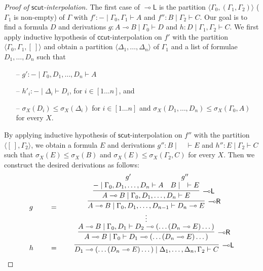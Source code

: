\documentclass[sn-mathphys-num]{sn-jnl}%
\newcommand{\GG}{\Gamma}
\newcommand{\GD}{\Delta}
\newcommand{\vd}{\vdash}
\newcommand{\lolli}{\multimap}
\newcommand{\lleft}{{\lolli}\mathsf{L}}
\newcommand{\lright}{{\lolli}\mathsf{R}}
\newcommand{\mf}[1]{\mathsf{#1}}
\newcommand{\gs}[1]{\sigma_{X} (#1)}
\theoremstyle{thmstyleone}%
\theoremstyle{thmstyletwo}%
\theoremstyle{thmstylethree}%
\begin{document}
\begin{proof}[Proof of $\mf{scut}$-interpolation]
The first case of $\lleft$ is the partition $\langle \GG_0, (\GG_1, \GG_2) \rangle$ ($\GG_1$ is non-empty) of $\GG$ with $f' : {-} \mid \GG_0, \GG_1 \vd A$ and $f'': B \mid \GG_2 \vd C$.
Our goal is to find a formula $D$ and derivations $g : A\lolli B \mid \GG_0 \vd D$ and $h: D \mid \GG_1, \GG_2 \vd C$.
We first apply inductive hypothesis of $\mf{ccut}$-interpolation on $f'$ with the partition $\langle \GG_0 , \GG_1 , [\ ]\rangle$ and obtain a partition $\langle \GD_1, \dots , \GD_n \rangle$ of $\GG_1$ and a list of formulae $D_1 , \dots , D_n$ such that
\begin{itemize}
  \item[--] $g': {-} \mid \GG_0 , D_1, \dots, D_n \vd A$
  \item[--] $h'_i : {-} \mid \GD_i \vd D_i$, for $i \in [1\dots n]$, and 
  \item[--] $\gs{D_i} \leq \gs{\GD_i}$ for $i \in [1 \dots n]$ and $\gs{D_1 , \dots , D_n} \leq \gs{\GG_0 , A}$ for every $X$.
\end{itemize}
By applying inductive hypothesis of $\mf{scut}$-interpolation on $f''$ with the partition $\langle [\ ] , \GG_2 \rangle$, we obtain a formula $E$ and derivations $g'' : B \mid \quad \vd E$ and $h'': E \mid \GG_2 \vd C$ such that $\gs{E} \leq\gs{B}$ and $ \gs{E} \leq \gs{\GG_2 , C}$ for every $X$.
Then we construct the desired derivations as follows:
\begin{displaymath}
\begin{array}{lcc}
  \begin{array}{c}
    g
  \end{array}
  \quad 
  &=&
  \quad
    \begin{array}{c}
      \infer[\lright]{A\lolli B \mid \GG_0 \vd D_1 \lolli (\dots (D_n \lolli E)\dots)}{
      \deduce{A \lolli B \mid \GG_0 , D_1 \vd D_2 \lolli (\dots (D_n \lolli E)\dots)}{\deduce{\vdots}{
        \infer[\lright]{A \lolli B \mid \GG_0 , D_1, \dots ,D_{n-1} \vd D_n \lolli E}{
        \infer[\lleft]{A \lolli B \mid \GG_0 , D_1, \dots, D_n \vd E}{
          \deduce{{-} \mid \GG_0 , D_1, \dots, D_n \vd A}{g'}
          &
          \deduce{B \mid \quad \vd E}{g''}
        }
      }
      }
      }
    }
    \end{array}
    \\[1.5cm]
    \begin{array}{c}
      h
    \end{array}
    \quad
    &=&
    \quad
    \begin{array}{c}
      \infer[\lleft]{D_1 \lolli (\dots (D_n \lolli E)\dots) \mid \GD_1, \dots, \GD_n, \GG_2 \vd C}{
}
\end{array}
\end{array}
\end{displaymath}
\end{proof}
\end{document}
